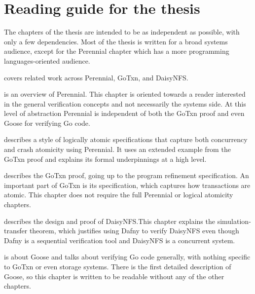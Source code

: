 \section{Reading guide for the thesis}
\label{sec:intro:reading-guide}

The chapters of the thesis are intended to be as independent as possible, with
only a few dependencies. Most of the thesis is written for a broad systems
audience, except for the Perennial chapter which has a more programming
languages-oriented audience.

 covers related work across Perennial, GoTxn, and DaisyNFS.

 is an overview of Perennial. This chapter is oriented
towards a reader interested in the general verification concepts and not
necessarily the systems side. At this level of abstraction Perennial is
independent of both the GoTxn proof and even Goose for verifying Go code.

 describes a style of logically atomic specifications
that capture both concurrency and crash atomicity using Perennial. It uses an
extended example from the GoTxn proof and explains its formal underpinnings at a
high level.

 describes the GoTxn proof, going up to the program refinement
specification. An important part of GoTxn
is its specification, which captures how transactions are atomic. This chapter
does not require the full Perennial or logical atomicity chapters.

 describes the design and proof of DaisyNFS.\@ This chapter
explains the simulation-transfer theorem, which justifies using Dafny to verify
DaisyNFS even though Dafny is a sequential verification tool and DaisyNFS is a
concurrent system.

 is about Goose and talks about verifying Go code generally, with
nothing specific to GoTxn or even storage systems. There is the first detailed
description of Goose, so this chapter is written to be readable without any of
the other chapters.
